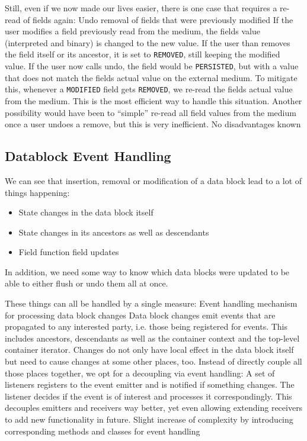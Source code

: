 Still, even if we now made our lives easier, there is one case that requires a re-read of fields again:
{%
Undo removal of fields that were previously modified
}
{%
If the user modifies a field previously read from the medium, the fields value (interpreted and binary) is changed to the new value. If the user than removes the field itself or its ancestor, it is set to \texttt{REMOVED}, still keeping the modified value. If the user now calls undo, the field would be \texttt{PERSISTED}, but with a value that does not match the fields actual value on the external medium. To mitigate this, whenever a \texttt{MODIFIED} field gets \texttt{REMOVED}, we re-read the fields actual value from the medium.
}
{%
This is the most efficient way to handle this situation. Another possibility would have been to ``simple'' re-read all field values from the medium once a user undoes a remove, but this is very inefficient.
}
{%
No disadvantages known
}

\subsection{Datablock Event Handling}%
\label{sec:DatablockEventHandling}%

We can see that insertion, removal or modification of a data block lead to a lot of things happening:
\begin{itemize}
\item State changes in the data block itself
\item State changes in its ancestors as well as descendants
\item Field function field updates
\end{itemize}

In addition, we need some way to know which data blocks were updated to be able to either flush or undo them all at once.

These things can all be handled by a single measure:
{%
Event handling mechanism for processing data block changes
}
{%
Data block changes emit events that are propagated to any interested party, i.e. those being registered for events. This includes ancestors, descendants as well as the container context and the top-level container iterator.
}
{%
Changes do not only have local effect in the data block itself but need to cause changes at some other places, too. Instead of directly couple all those places together, we opt for a decoupling via event handling: A set of listeners registers to the event emitter and is notified if something changes. The listener decides if the event is of interest and processes it correspondingly. This decouples emitters and receivers way better, yet even allowing extending receivers to add new functionality in future.
}
{%
Slight increase of complexity by introducing corresponding methods and classes for event handling
}

